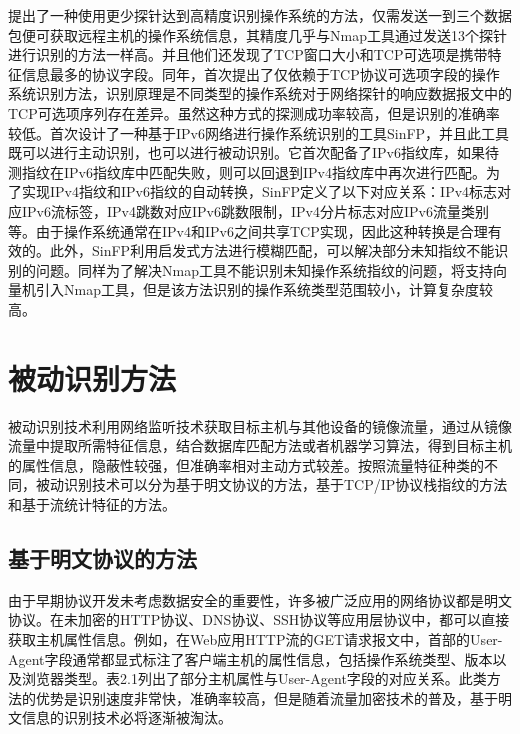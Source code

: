 \citet{greenwald2007toward}提出了一种使用更少探针达到高精度识别操作系统的方法，仅需发送一到三个数据包便可获取远程主机的操作系统信息，其精度几乎与Nmap工具通过发送13个探针进行识别的方法一样高。并且他们还发现了TCP窗口大小和TCP可选项是携带特征信息最多的协议字段。同年，\citet{liuying2007ji}首次提出了仅依赖于TCP协议可选项字段的操作系统识别方法，识别原理是不同类型的操作系统对于网络探针的响应数据报文中的TCP可选项序列存在差异。虽然这种方式的探测成功率较高，但是识别的准确率较低。\citet{auffret2010sinfp}首次设计了一种基于IPv6网络进行操作系统识别的工具SinFP，并且此工具既可以进行主动识别，也可以进行被动识别。它首次配备了IPv6指纹库，如果待测指纹在IPv6指纹库中匹配失败，则可以回退到IPv4指纹库中再次进行匹配。为了实现IPv4指纹和IPv6指纹的自动转换，SinFP定义了以下对应关系：IPv4标志对应IPv6流标签，IPv4跳数对应IPv6跳数限制，IPv4分片标志对应IPv6流量类别等。由于操作系统通常在IPv4和IPv6之间共享TCP实现，因此这种转换是合理有效的。此外，SinFP利用启发式方法进行模糊匹配，可以解决部分未知指纹不能识别的问题。同样为了解决Nmap工具不能识别未知操作系统指纹的问题，\citet{zhoutiezheng2011ji}将支持向量机引入Nmap工具，但是该方法识别的操作系统类型范围较小，计算复杂度较高。

\section{被动识别方法}
被动识别技术利用网络监听技术获取目标主机与其他设备的镜像流量，通过从镜像流量中提取所需特征信息，结合数据库匹配方法或者机器学习算法，得到目标主机的属性信息，隐蔽性较强，但准确率相对主动方式较差。按照流量特征种类的不同，被动识别技术可以分为基于明文协议的方法，基于TCP/IP协议栈指纹的方法和基于流统计特征的方法。

\subsection{基于明文协议的方法}

由于早期协议开发未考虑数据安全的重要性，许多被广泛应用的网络协议都是明文协议。在未加密的HTTP协议、DNS协议、SSH协议等应用层协议中，都可以直接获取主机属性信息。例如，在Web应用HTTP流的GET请求报文中，首部的User-Agent字段通常都显式标注了客户端主机的属性信息，包括操作系统类型、版本以及浏览器类型。表2.1列出了部分主机属性与User-Agent字段的对应关系。此类方法的优势是识别速度非常快，准确率较高，但是随着流量加密技术的普及，基于明文信息的识别技术必将逐渐被淘汰。

